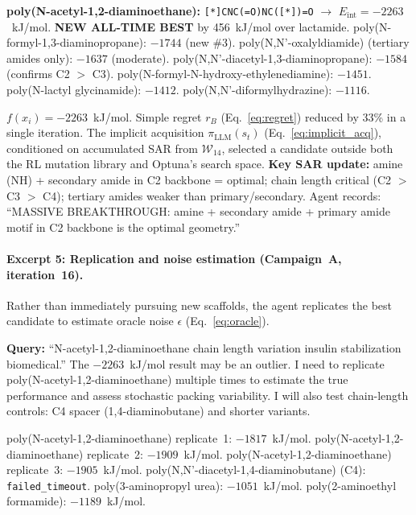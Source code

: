 \documentclass[twocolumn]{fairmeta}
\begin{document}
\begin{toolcall}
\scriptsize
\textbf{poly(N-acetyl-1,2-diaminoethane):} \texttt{[*]CNC(=O)NC([*])=O} $\to$ $E_\text{int} = -2263$~kJ/mol.
\textbf{NEW ALL-TIME BEST} by 456~kJ/mol over lactamide.
poly(N-formyl-1,3-diaminopropane): $-1744$ (new \#3).
poly(N,N'-oxalyldiamide) (tertiary amides only): $-1637$ (moderate).
poly(N,N'-diacetyl-1,3-diaminopropane): $-1584$ (confirms C2 $>$ C3).
poly(N-formyl-N-hydroxy-ethylenediamine): $-1451$.
poly(N-lactyl glycinamide): $-1412$.
poly(N,N'-diformylhydrazine): $-1116$.
\end{toolcall}

\begin{observation}
\scriptsize
$f(x_i) = -2263$~kJ/mol. Simple regret $r_B$ (Eq.~\ref{eq:regret}) reduced by 33\% in a single iteration.
The implicit acquisition $\pi_\text{LLM}(s_t)$ (Eq.~\ref{eq:implicit_acq}), conditioned on accumulated SAR from $\mathcal{W}_{14}$, selected a candidate outside both the RL mutation library and Optuna's search space.
\textbf{Key SAR update:} amine (NH) + secondary amide in C2 backbone = optimal; chain length critical (C2 $>$ C3 $>$ C4);
tertiary amides weaker than primary/secondary.
Agent records: ``MASSIVE BREAKTHROUGH: amine + secondary amide + primary amide motif in C2 backbone is the optimal geometry.''
\end{observation}

\paragraph{Excerpt 5: Replication and noise estimation (Campaign~A, iteration~16).}
Rather than immediately pursuing new scaffolds, the agent replicates the best candidate to estimate oracle noise $\epsilon$ (Eq.~\ref{eq:oracle}).

\begin{agentthought}
\scriptsize
\textbf{Query:} ``N-acetyl-1,2-diaminoethane chain length variation insulin stabilization biomedical.''
The $-2263$~kJ/mol result may be an outlier.
I need to replicate poly(N-acetyl-1,2-diaminoethane) multiple times to estimate the true performance and assess stochastic packing variability.
I will also test chain-length controls: C4 spacer (1,4-diaminobutane) and shorter variants.
\end{agentthought}

\begin{toolcall}
\scriptsize
poly(N-acetyl-1,2-diaminoethane) replicate~1: $-1817$~kJ/mol.
poly(N-acetyl-1,2-diaminoethane) replicate~2: $-1909$~kJ/mol.
poly(N-acetyl-1,2-diaminoethane) replicate~3: $-1905$~kJ/mol.
poly(N,N'-diacetyl-1,4-diaminobutane) (C4): \texttt{failed\_timeout}.
poly(3-aminopropyl urea): $-1051$~kJ/mol.
poly(2-aminoethyl formamide): $-1189$~kJ/mol.
\end{toolcall}
\end{document}
